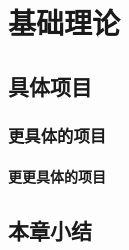 \documentclass[../main.tex]{subfiles}
\begin{document}
\chapter{基础理论}\label{chap-pre}

\section{具体项目}

\subsection{更具体的项目}

\subsubsection{更更具体的项目}

\section{本章小结}
\end{document}
